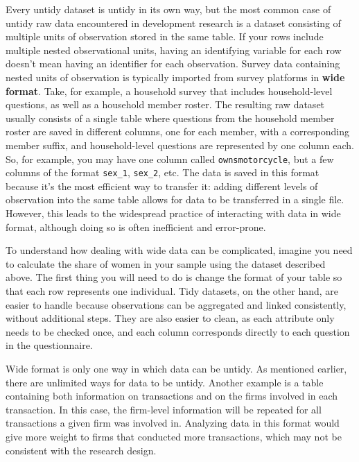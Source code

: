 Every untidy dataset is untidy in its own way,
but the most common case of untidy raw data encountered in development research
is a dataset consisting of multiple units of observation stored in the same table. 
If your rows include multiple nested observational units,
having an identifying variable for each row doesn't mean having an identifier for each observation.
Survey data containing nested units of observation is typically 
imported from survey platforms in \textbf{wide format}.
Take, for example, a household survey that includes household-level questions,
as well as a household member roster.
The resulting raw dataset usually consists of a single table
where questions from the household member roster are saved in different columns, 
one for each member, with a corresponding member suffix,
and household-level questions are represented by one column each.
So, for example, you may have one column called \texttt{ownsmotorcycle},
but a few columns of the format \texttt{sex\_1}, \texttt{sex\_2}, etc.
The data is saved in this format because it's the most efficient way to transfer it:
adding different levels of observation into the same table allows for data to be transferred in a single file.
However, this leads to the widespread practice of interacting with data in wide format,
although doing so is often inefficient and error-prone.

To understand how dealing with wide data can be complicated,
imagine you need to calculate the share of women in your sample using the dataset described above.
The first thing you will need to do is change the format of your table so that each row represents one individual.
Tidy datasets, on the other hand, 
are easier to handle because observations can be aggregated and linked consistently,
without additional steps.
They are also easier to clean, 
as each attribute only needs to be checked once,
and each column corresponds directly to each question in the questionnaire.

Wide format is only one way in which data can be untidy.
As mentioned earlier, there are unlimited ways for data to be untidy.
Another example is a table containing both information on transactions
and on the firms involved in each transaction.
In this case, the firm-level information will be repeated for all transactions a given firm was involved in.
Analyzing data in this format would give more weight to firms that conducted more transactions,
which may not be consistent with the research design.

